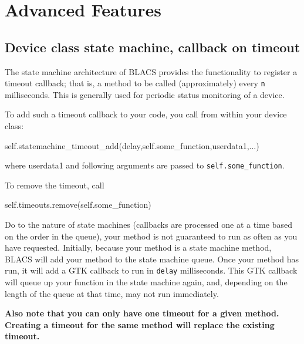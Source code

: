 \documentclass[12pt]{article}
\begin{document}
\section{Advanced Features}

\subsection{Device class state machine, callback on timeout}
The state machine architecture of BLACS provides the functionality to register a timeout callback; that is, a method to be called (approximately) every \texttt{n} milliseconds. This is generally used for periodic status monitoring of a device.

To add such a timeout callback to your code, you call from within your device class:
\begin{python}
self.statemachine_timeout_add(delay,self.some_function,userdata1,...)
\end{python}
where userdata1 and following arguments are passed to \texttt{self.some\_function}.

To remove the timeout, call 
\begin{python}
self.timeouts.remove(self.some_function)
\end{python}

Do to the nature of state machines (callbacks are processed one at a time based on the order in the queue), your method is not guaranteed to run as often as you have requested. Initially, because your method is a state machine method, BLACS will add your method to the state machine queue. Once your method has run, it will add a GTK callback to run in \texttt{delay} milliseconds. This GTK callback will queue up your function in the state machine again, and, depending on the length of the queue at that time, may not run immediately. 

\textbf{Also note that you can only have one timeout for a given method. Creating a timeout for the same method will replace the existing timeout.}
\end{document}
